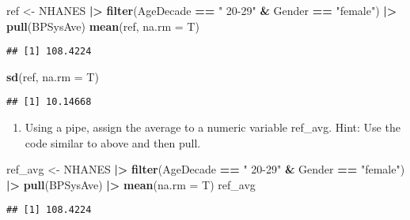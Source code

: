 \documentclass[
]{article}
\newenvironment{Shaded}{\begin{snugshade}}{\end{snugshade}}
\newcommand{\AttributeTok}[1]{\textcolor[rgb]{0.13,0.29,0.53}{#1}}
\newcommand{\FunctionTok}[1]{\textcolor[rgb]{0.13,0.29,0.53}{\textbf{#1}}}
\newcommand{\NormalTok}[1]{#1}
\newcommand{\OtherTok}[1]{\textcolor[rgb]{0.56,0.35,0.01}{#1}}
\newcommand{\SpecialCharTok}[1]{\textcolor[rgb]{0.81,0.36,0.00}{\textbf{#1}}}
\newcommand{\StringTok}[1]{\textcolor[rgb]{0.31,0.60,0.02}{#1}}
\providecommand{\tightlist}{%
  \setlength{\itemsep}{0pt}\setlength{\parskip}{0pt}}
\begin{document}
\begin{Shaded}
\begin{Highlighting}[]
\NormalTok{ref }\OtherTok{\textless{}{-}}\NormalTok{ NHANES }\SpecialCharTok{|\textgreater{}} 
      \FunctionTok{filter}\NormalTok{(AgeDecade }\SpecialCharTok{==} \StringTok{" 20{-}29"} \SpecialCharTok{\&}\NormalTok{ Gender }\SpecialCharTok{==} \StringTok{"female"}\NormalTok{)  }\SpecialCharTok{|\textgreater{}} 
      \FunctionTok{pull}\NormalTok{(BPSysAve)}
\FunctionTok{mean}\NormalTok{(ref, }\AttributeTok{na.rm =}\NormalTok{ T)}
\end{Highlighting}
\end{Shaded}

\begin{verbatim}
## [1] 108.4224
\end{verbatim}

\begin{Shaded}
\begin{Highlighting}[]
\FunctionTok{sd}\NormalTok{(ref, }\AttributeTok{na.rm =}\NormalTok{ T)}
\end{Highlighting}
\end{Shaded}

\begin{verbatim}
## [1] 10.14668
\end{verbatim}

\begin{enumerate}
\def\labelenumi{\arabic{enumi}.}
\setcounter{enumi}{1}
\tightlist
\item
  Using a pipe, assign the average to a numeric variable ref\_avg. Hint:
  Use the code similar to above and then pull.
\end{enumerate}

\begin{Shaded}
\begin{Highlighting}[]
\NormalTok{ref\_avg }\OtherTok{\textless{}{-}}\NormalTok{ NHANES }\SpecialCharTok{|\textgreater{}} 
      \FunctionTok{filter}\NormalTok{(AgeDecade }\SpecialCharTok{==} \StringTok{" 20{-}29"} \SpecialCharTok{\&}\NormalTok{ Gender }\SpecialCharTok{==} \StringTok{"female"}\NormalTok{)  }\SpecialCharTok{|\textgreater{}} 
      \FunctionTok{pull}\NormalTok{(BPSysAve) }\SpecialCharTok{|\textgreater{}} 
      \FunctionTok{mean}\NormalTok{(}\AttributeTok{na.rm =}\NormalTok{ T)}
\NormalTok{ref\_avg}
\end{Highlighting}
\end{Shaded}

\begin{verbatim}
## [1] 108.4224
\end{verbatim}
\end{document}
